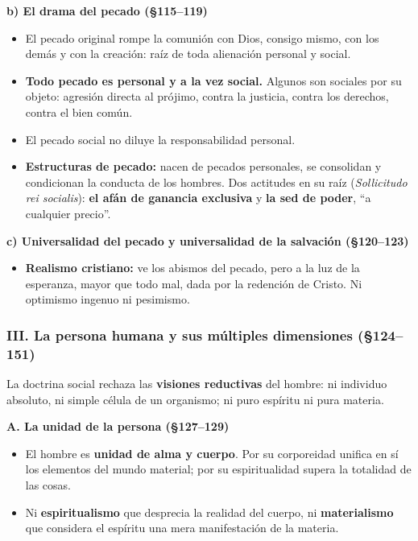 \documentclass[10pt,a4paper]{article}
\begin{document}
\medskip\noindent \textbf{b) El drama del pecado (\S{}115--119)}\par\nopagebreak
\begin{itemize}
\item El pecado original rompe la comunión con Dios, consigo mismo, con los demás y con la creación: raíz de toda alienación personal y social.
\item \textbf{Todo pecado es personal y a la vez social.} Algunos son sociales por su objeto: agresión directa al prójimo, contra la justicia, contra los derechos, contra el bien común.
\item El pecado social no diluye la responsabilidad personal.
\item \textbf{Estructuras de pecado:} nacen de pecados personales, se consolidan y condicionan la conducta de los hombres. Dos actitudes en su raíz (\textit{Sollicitudo rei socialis}): \textbf{el afán de ganancia exclusiva} y \textbf{la sed de poder}, ``a cualquier precio''.
\end{itemize}

\medskip\noindent \textbf{c) Universalidad del pecado y universalidad de la salvación (\S{}120--123)}\par\nopagebreak
\begin{itemize}
\item \textbf{Realismo cristiano:} ve los abismos del pecado, pero a la luz de la esperanza, mayor que todo mal, dada por la redención de Cristo. Ni optimismo ingenuo ni pesimismo.
\end{itemize}

\subsubsection{III. La persona humana y sus múltiples dimensiones (\S{}124--151)}
\noindent La doctrina social rechaza las \textbf{visiones reductivas} del hombre: ni individuo absoluto, ni simple célula de un organismo; ni puro espíritu ni pura materia.\par\smallskip

\medskip\noindent \textbf{A. La unidad de la persona (\S{}127--129)}\par\nopagebreak
\begin{itemize}
\item El hombre es \textbf{unidad de alma y cuerpo}. Por su corporeidad unifica en sí los elementos del mundo material; por su espiritualidad supera la totalidad de las cosas.
\item Ni \textbf{espiritualismo} que desprecia la realidad del cuerpo, ni \textbf{materialismo} que considera el espíritu una mera manifestación de la materia.
\end{itemize}
\end{document}

